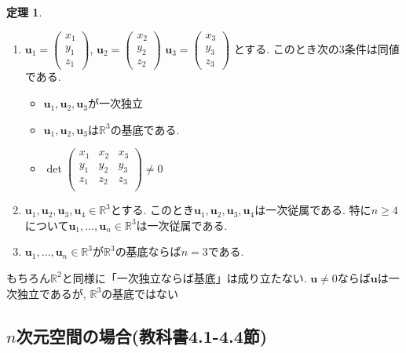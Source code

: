 \documentclass[dvipdfmx,a4paper,11pt]{article}
\newcommand{\R}{\mathbb{R}}
\theoremstyle{definition}
\newtheorem{thm}{定理}
\begin{document}
\begin{tcolorbox}[
    colback = white,
    colframe = green!35!black,
    fonttitle = \bfseries,
    breakable = true]
    \begin{thm}
    \begin{enumerate}
	\setlength{\parskip}{0cm}
  	\setlength{\itemsep}{0pt} 
\item $\bm{u}_1 =   
\begin{pmatrix}
x_1\\  y_1\\ z_1
 \end{pmatrix} $, 
 $\bm{u}_2 =   
\begin{pmatrix}
x_2\\  y_2\\ z_2
 \end{pmatrix} $
  $\bm{u}_3 =   
\begin{pmatrix}
x_3\\  y_3\\ z_3
 \end{pmatrix} $
 とする. このとき次の3条件は同値である.
 \begin{itemize}
 \setlength{\parskip}{0cm}
  	\setlength{\itemsep}{0pt} 
 \item $\bm{u}_1, \bm{u}_2,  \bm{u}_3$が一次独立
  \item $\bm{u}_1, \bm{u}_2,  \bm{u}_3$は$\R^3$の基底である. 
\item  $\det 
 \begin{pmatrix}
x_1&x_2&x_3\\  
y_1&y_2&y_3\\ 
z_1&z_2&z_3\\
 \end{pmatrix} 
  \neq 0$
  \end{itemize}
 \item  $\bm{u}_1, \bm{u}_2, \bm{u}_3,  \bm{u}_4\in \R^3 $とする. このとき$\bm{u}_1, \bm{u}_2, \bm{u}_3, \bm{u}_4$は一次従属である. 特に$n \ge 4$について$\bm{u}_1, \ldots, \bm{u}_n \in \R^3$は一次従属である. 
 \item   $\bm{u}_1, \ldots, \bm{u}_n \in \R^3 $が$\R^3$の基底ならば$n=3$である. 
\end{enumerate}
    \end{thm}
 \end{tcolorbox}


もちろん$\R^2$と同様に「一次独立ならば基底」は成り立たない. 
$\bm{u}\neq 0$ならば$\bm{u}$は一次独立であるが, $\R^3$の基底ではない
 
 \subsection{$n$次元空間の場合(教科書4.1-4.4節)}
 
\end{document}
